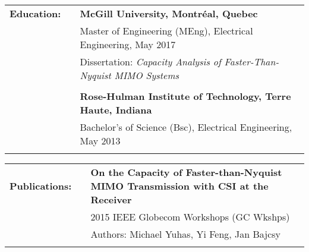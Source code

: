 \documentclass{minimal}
\begin{document}
\begin{tabular}{ p{1.5cm} p{1cm} p{16cm} }
\textbf{Education:} & & \textbf{McGill University, Montréal, Quebec} \\
& & Master of Engineering (MEng), Electrical Engineering, May 2017\\
& & Dissertation: \textit{Capacity Analysis of Faster-Than-Nyquist MIMO Systems}\\
& & \\
& & \textbf{Rose-Hulman Institute of Technology, Terre Haute, Indiana} \\
& & Bachelor's of Science (Bsc), Electrical Engineering, May 2013\\
& & \\
\end{tabular}

\begin{tabular}{ p{1.5cm} p{1cm} p{16cm} }
\textbf{Publications:} & & \textbf{On the Capacity of Faster-than-Nyquist MIMO Transmission with CSI at the Receiver}\\
& & 2015 IEEE Globecom Workshops (GC Wkshps)\\
& & Authors: Michael Yuhas, Yi Feng, Jan Bajcsy\\
& & \\
\end{tabular}
\end{document}
